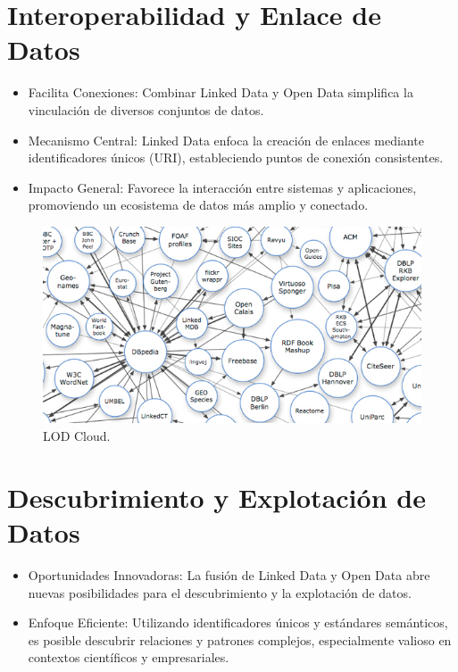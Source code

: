 \documentclass[11pt]{report}
\begin{document}
		\section{Interoperabilidad y Enlace de Datos}
		
\begin{itemize}
  \item Facilita Conexiones: Combinar Linked Data y Open Data simplifica la vinculación de diversos conjuntos de datos.
  \item Mecanismo Central: Linked Data enfoca la creación de enlaces mediante identificadores únicos (URI), estableciendo puntos de conexión consistentes.
  \item Impacto General: Favorece la interacción entre sistemas y aplicaciones, promoviendo un ecosistema de datos más amplio y conectado.
\end{itemize}

\begin{figure}[H]
	\centering
	\includegraphics[scale=0.4]{../img/lod.jpg}
	\caption{LOD Cloud.}
	\label{fig:lod}
\end{figure}

\section{Descubrimiento y Explotación de Datos}

\begin{itemize}
  \item Oportunidades Innovadoras: La fusión de Linked Data y Open Data abre nuevas posibilidades para el descubrimiento y la explotación de datos.
  \item Enfoque Eficiente: Utilizando identificadores únicos y estándares semánticos, es posible descubrir relaciones y patrones complejos, especialmente valioso en contextos científicos y empresariales.
\end{itemize}
\end{document}

